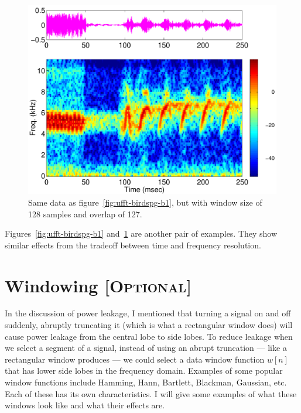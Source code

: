 \begin{figure}[p]
\centerline{\includegraphics[height=0.4\textheight]{ch-fft/ufft_bluewing1am_spg128_127}}
\caption[Same data as figure~\protect\ref{fig:ufft-birdspg-b1}; 128
sample window, overlap 127]{Same data as
figure~\protect\ref{fig:ufft-birdspg-b1}, but with window size of 128
samples and overlap of 127.\label{fig:ufft-birdspg-b2}}
\end{figure}

Figures~\ref{fig:ufft-birdspg-b1} and~\ref{fig:ufft-birdspg-b2} are
another pair of examples. They show similar effects from the tradeoff
between time and frequency resolution.

\section{Windowing [\textsc{Optional}]}

In the discussion of power leakage, I mentioned that turning a signal
on and off suddenly, abruptly truncating it (which is what a
rectangular window does) will cause power leakage from the central
lobe to side lobes. To reduce leakage when we select a segment of a
signal, instead of using an abrupt truncation --- like a rectangular
window produces --- we could select a data window function $w[n]$ that
has lower side lobes in the frequency domain. Examples of some popular
window functions include Hamming, Hann, Bartlett, Blackman, Gaussian,
etc. Each of these has its own characteristics. I will give some
examples of what these windows look like and what their effects are.


